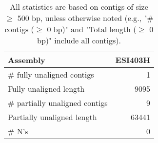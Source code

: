 \documentclass[12pt,a4paper]{article}
\begin{document}
\begin{table}[ht]
\begin{center}
\caption{All statistics are based on contigs of size $\geq$ 500 bp, unless otherwise noted (e.g., "\# contigs ($\geq$ 0 bp)" and "Total length ($\geq$ 0 bp)" include all contigs).}
\begin{tabular}{|l*{1}{|r}|}
\hline
Assembly & ESI403H \\ \hline
\# fully unaligned contigs & 1 \\ \hline
Fully unaligned length & 9095 \\ \hline
\# partially unaligned contigs & 9 \\ \hline
Partially unaligned length & 63441 \\ \hline
\# N's & 0 \\ \hline
\end{tabular}
\end{center}
\end{table}
\end{document}
